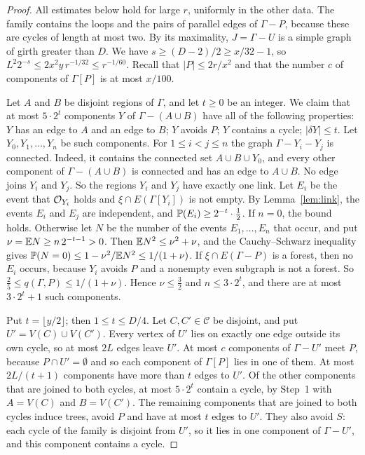 \begin{proof}
All estimates below hold for large $r$, uniformly in the other data. The family contains the
loops and the pairs of parallel edges of $\Gamma-P$, because these are cycles of length at most
two. By its maximality, $J=\Gamma-U$ is a simple graph of girth greater than $D$. We have
$s\ge(D-2)/2\ge x/32-1$, so $L^{2}2^{-s}\le2x^{2}y\,r^{-1/32}\le r^{-1/60}$. Recall that
$|P|\le2r/x^{2}$ and that the number $c$ of components of $\Gamma[P]$ is at most $x/100$.

 Let $A$ and $B$ be disjoint regions of $\Gamma$, and let
$t\ge0$ be an integer. We claim that at most $5\cdot2^{t}$ components $Y$ of $\Gamma-(A\cup B)$
have all of the following properties: $Y$ has an edge to $A$ and an edge to $B$; $Y$ avoids $P$;
$Y$ contains a cycle; $|\delta Y|\le t$. Let $Y_0,Y_1,\dots,Y_n$ be such components. For
$1\le i<j\le n$ the graph $\Gamma-Y_i-Y_j$ is connected. Indeed, it contains the connected set
$A\cup B\cup Y_0$, and every other component of $\Gamma-(A\cup B)$ is connected and has an edge to
$A\cup B$. No edge joins $Y_i$ and $Y_j$. So the regions $Y_i$ and $Y_j$ have exactly one link.
Let $E_i$ be the event that $\mathcal{O}_{Y_i}$ holds and $\xi\cap E(\Gamma[Y_i])$ is not empty. By
Lemma~\ref{lem:link}, the events $E_i$ and $E_j$ are independent, and
$\mathbb{P}(E_i)\ge2^{-t}\cdot\tfrac12$. If $n=0$, the bound holds. Otherwise let $N$ be the number of the
events $E_1,\dots,E_n$ that occur, and put $\nu=\mathbb{E} N\ge n\,2^{-t-1}>0$. Then
$\mathbb{E} N^{2}\le\nu^{2}+\nu$, and the Cauchy--Schwarz inequality gives
$\mathbb{P}(N=0)\le1-\nu^{2}/\mathbb{E} N^{2}\le1/(1+\nu)$. If $\xi\cap E(\Gamma-P)$ is a forest, then no $E_i$
occurs, because $Y_i$ avoids $P$ and a nonempty even subgraph is not a forest. So
$\frac25\le q(\Gamma,P)\le1/(1+\nu)$. Hence $\nu\le\frac32$ and $n\le3\cdot2^{t}$, and there are
at most $3\cdot2^{t}+1$ such components.

 Put $t=\lfloor y/2\rfloor$; then $1\le t\le D/4$. Let
$C,C'\in\mathcal C$ be disjoint, and put $U'=V(C)\cup V(C')$. Every vertex of $U'$ lies on exactly
one edge outside its own cycle, so at most $2L$ edges leave $U'$. At most $c$ components of
$\Gamma-U'$ meet $P$, because $P\cap U'=\emptyset$ and so each component of $\Gamma[P]$ lies in one
of them. At most $2L/(t+1)$ components have more than $t$ edges to $U'$. Of the other components
that are joined to both cycles, at most $5\cdot2^{t}$ contain a cycle, by Step~1 with $A=V(C)$
and $B=V(C')$. The remaining components that are joined to both cycles induce trees, avoid $P$
and have at most $t$ edges to $U'$. They also avoid $S$: each cycle of the family is disjoint
from $U'$, so it lies in one component of $\Gamma-U'$, and this component contains a cycle.


\end{proof}
